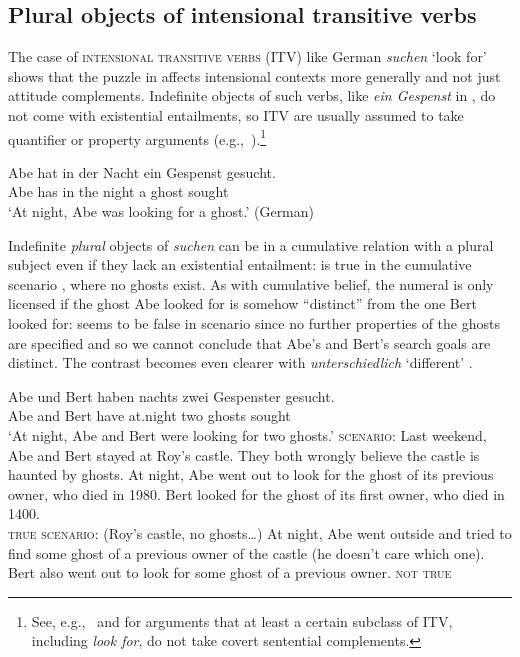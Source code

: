 \documentclass[output=paper]{langscibook}
\begin{document}
\subsection{Plural objects of intensional transitive verbs}

The case of  \textsc{intensional transitive verbs} (ITV) like  German \textit{suchen} `look for' shows that 
 the puzzle in  affects intensional contexts more generally and not just attitude complements. Indefinite objects of such verbs, like \textit{ein Gespenst} in , do not come with existential entailments, so ITV are usually assumed to take quantifier or property arguments (e.g.,~\citealt{Montague:1974,Zimmermann:1993}).\footnote{See, e.g.,~\citet{Schwarz:2021} and \citet{Deal:2008} for arguments that at least a certain subclass of ITV, including \textit{look for}, do not take covert sentential complements.} 

\ea \label{sch-has:ex:12} {\gll Abe hat in der Nacht ein Gespenst gesucht. \\
Abe has in the night a ghost sought \\
\glt `At night, Abe was looking for a ghost.' \hfill (German)}  \z

\noindent Indefinite \textit{plural} objects of \textit{suchen} can be in a cumulative relation with a plural subject even if they lack an existential entailment:  is true in the cumulative scenario , where no ghosts exist. As with cumulative belief, the numeral is only licensed if the ghost Abe looked for is somehow ``distinct'' from the one Bert looked for:  seems to be false in scenario  since no further properties of the ghosts are specified and so we cannot conclude that Abe's and Bert's search goals are distinct. The contrast becomes even clearer with \textit{unterschiedlich} `different' .

\eanoraggedright \label{sch-has:ex:9ff}
\eanoraggedright \label{sch-has:ex:10} {\gll Abe und Bert haben nachts zwei Gespenster gesucht. \\
Abe and Bert have at.night two ghosts sought \\
\glt `At night, Abe and Bert were looking for two ghosts.'}
\ex \label{sch-has:ex:9} \textsc{scenario:} Last weekend, Abe and Bert stayed at Roy's castle. They both wrongly believe the castle is haunted by ghosts. At night, Abe went out to look for the ghost of its previous owner, who died in 1980. Bert looked for the ghost of its first owner, who died in 1400.\\\null\hfill {} \textsc{true}
\ex \label{sch-has:ex:11} \textsc{scenario:} (Roy's castle, no ghosts\ldots) At night, Abe went outside and tried to find some ghost of a previous owner of the castle (he doesn't care which one). Bert also went out to look for some ghost of a previous owner. \hfill {} \textsc{not true}
\z\z
\end{document}
